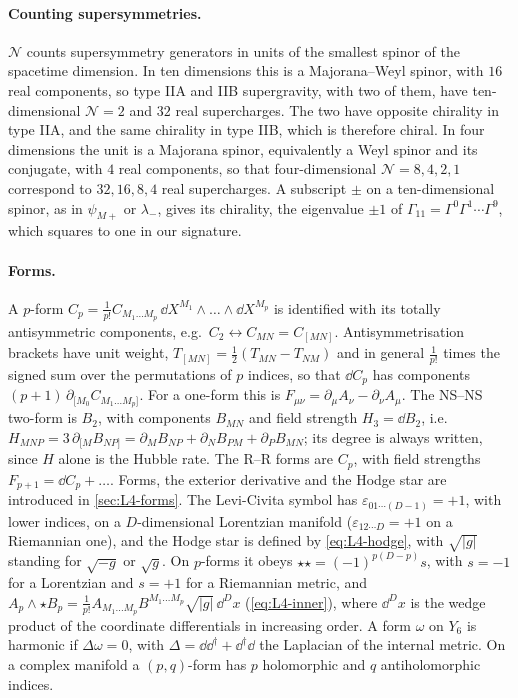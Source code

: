 \paragraph{Counting supersymmetries.} $\mathcal N$ counts supersymmetry generators in units of the smallest spinor of the spacetime dimension. In ten dimensions this is a Majorana--Weyl spinor, with $16$ real components, so type IIA and IIB supergravity, with two of them, have ten-dimensional $\mathcal N=2$ and $32$ real supercharges. The two have opposite chirality in type IIA, and the same chirality in type IIB, which is therefore chiral. In four dimensions the unit is a Majorana spinor, equivalently a Weyl spinor and its conjugate, with $4$ real components, so that four-dimensional $\mathcal N = 8,4,2,1$ correspond to $32,16,8,4$ real supercharges. A subscript $\pm$ on a ten-dimensional spinor, as in $\psi_{M+}$ or $\lambda_-$, gives its chirality, the eigenvalue $\pm1$ of $\Gamma_{11} = \Gamma^0\Gamma^1\cdots\Gamma^9$, which squares to one in our signature.

\paragraph{Forms.} A $p$-form $C_p = \frac{1}{p!}C_{M_1\dots M_p}\,\dd X^{M_1}\wedge\dots\wedge\dd X^{M_p}$ is identified with its totally antisymmetric components, e.g.\ $C_2\leftrightarrow C_{MN} = C_{[MN]}$. Antisymmetrisation brackets have unit weight, $T_{[MN]} = \frac12(T_{MN}-T_{NM})$ and in general $\frac{1}{p!}$ times the signed sum over the permutations of $p$ indices, so that $\dd C_p$ has components $(p+1)\,\partial_{[M_0}C_{M_1\dots M_p]}$. For a one-form this is $F_{\mu\nu} = \partial_\mu A_\nu - \partial_\nu A_\mu$. The NS--NS two-form is $B_2$, with components $B_{MN}$ and field strength $H_3 = \dd B_2$, i.e.\ $H_{MNP} = 3\,\partial_{[M}B_{NP]} = \partial_MB_{NP}+\partial_NB_{PM}+\partial_PB_{MN}$; its degree is always written, since $H$ alone is the Hubble rate. The R--R forms are $C_p$, with field strengths $F_{p+1} = \dd C_p + \dots$. Forms, the exterior derivative and the Hodge star are introduced in \cref{sec:L4-forms}. The Levi-Civita symbol has $\varepsilon_{01\cdots(D-1)} = +1$, with lower indices, on a $D$-dimensional Lorentzian manifold ($\varepsilon_{12\cdots D} = +1$ on a Riemannian one), and the Hodge star is defined by \cref{eq:L4-hodge}, with $\sqrt{|g|}$ standing for $\sqrt{-g}$ or $\sqrt{g}$. On $p$-forms it obeys $\star\star = (-1)^{p(D-p)}s$, with $s = -1$ for a Lorentzian and $s = +1$ for a Riemannian metric, and $A_p\wedge\star B_p = \frac{1}{p!}A_{M_1\dots M_p}B^{M_1\dots M_p}\sqrt{|g|}\,\dd^Dx$ (\cref{eq:L4-inner}), where $\dd^Dx$ is the wedge product of the coordinate differentials in increasing order. A form $\omega$ on $Y_6$ is harmonic if $\Delta\omega = 0$, with $\Delta = \dd\dd^\dagger + \dd^\dagger\dd$ the Laplacian of the internal metric. On a complex manifold a $(p,q)$-form has $p$ holomorphic and $q$ antiholomorphic indices.

